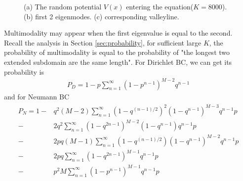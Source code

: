 \documentclass[12pt,a4paper]{article}
\begin{document}
\begin{figure}[h]
\centering
{}
\caption{(a) The random potential $V(x)$ entering the equation($K = 8000$). (b) first 2 eigenmodes. (c) corresponding valleyline.}
\label{fig:10e}
\end{figure}

Multimodality may appear when the first eigenvalue is equal to the second. Recall the analysis in Section \ref{sec:probability}, for sufficient large $K$, the probability of multimodality is equal to the probability of "the longest two extended subdomain are the same length". For Dirichlet BC, we can get its probability is
\begin{align}\label{eq:multiD}
P_D = 1 - p \sum_{n=1}^{\infty} (1 - p^{n-1})^{M-2} q^{n-1}
\end{align}
and for Neumann BC
\begin{align}\label{eq:multiN}
\begin{split}
P_N = 1 - & q^2 (M-2) \sum_{n=1}^{\infty} (1 - q^{(n-1)/2})^2 (1 - q^{n-1})^{M-3} q^{n-1} p \\
- & 2 q^2 \sum_{n=1}^{\infty} (1 - q^{2n-1})^{M-2} (1 - q^{n-1}) q^{n-1} p \\
- & 2 p q (M-1) \sum_{n=1}^{\infty} (1 - q^{(n-1)/2}) (1 - q^{n-1})^{M-2} q^{n-1} p \\
- & 2 p q \sum_{n=1}^{\infty} (1 - q^{2n-1})^{M-1} q^{n-1} p \\
- & p^2 M \sum_{n=1}^{\infty} (1 - p^{n-1})^{M-1} q^{n-1} p
\end{split}
\end{align}
\end{document}
